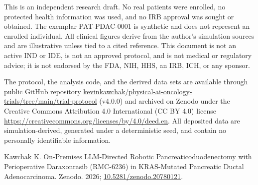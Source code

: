 This is an independent research draft. No real patients were enrolled, no protected
health information was used, and no IRB approval was sought or obtained. The
exemplar PAT-PDAC-0001 is synthetic and does not represent an enrolled individual.
All clinical figures derive from the author's simulation sources and are
illustrative unless tied to a cited reference. This document is not an active IND
or IDE, is not an approved protocol, and is not medical or regulatory advice; it is
not endorsed by the FDA, NIH, HHS, an IRB, ICH, or any sponsor.

The protocol, the analysis code, and the derived data sets are available through public GitHub repository \href{https://github.com/kevinkawchak/physical-ai-oncology-trials/tree/main/trial-protocol}{kevinkawchak/physical-ai-oncology-trials/tree/main/trial-protocol} (v4.0.0) and archived on Zenodo under the Creative Commons
Attribution 4.0 International (CC BY 4.0) license \href{https://creativecommons.org/licenses/by/4.0/deed.en}{https://creativecommons.org/licenses/by/4.0/deed.en}. All deposited data are simulation-derived,
generated under a deterministic seed, and contain no personally identifiable
information.

Kawchak K. On-Premises LLM-Directed Robotic Pancreaticoduodenectomy with Perioperative Daraxonrasib (RMC-6236) in KRAS-Mutated Pancreatic Ductal Adenocarcinoma. Zenodo. 2026; \href{https://doi.org/10.5281/zenodo.20780121}{10.5281/zenodo.20780121}.

\begingroup\raggedright\nocite{*}\endgroup
